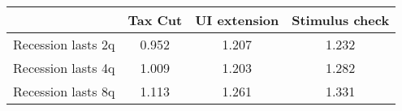 \begin{tabular}{@{}lccc@{}} 
\toprule 
& Tax Cut    & UI extension    & Stimulus check    \\  \midrule 
Recession lasts 2q &0.952  & 1.207  & 1.232     \\ 
Recession lasts 4q &1.009  & 1.203  & 1.282     \\ 
Recession lasts 8q &1.113  & 1.261  & 1.331     \\ 
\end{tabular}  
